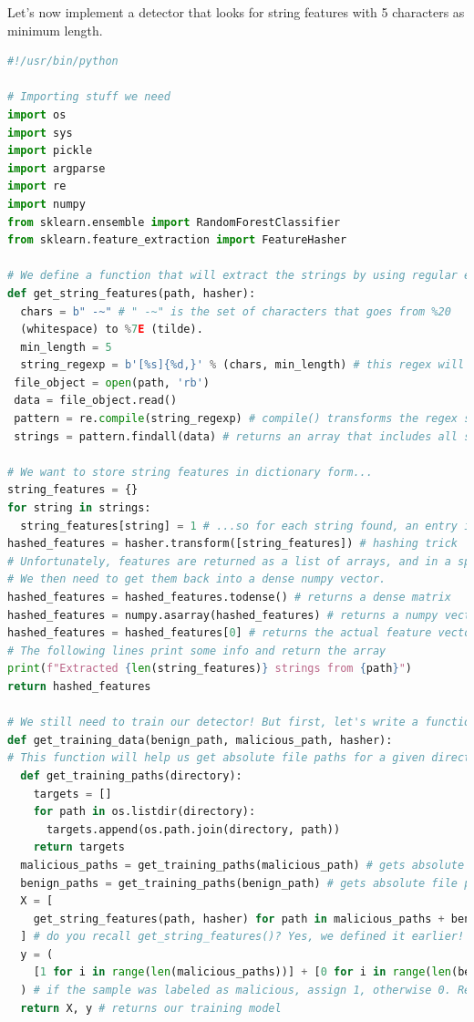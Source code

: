 \documentclass[]{project_plan}
\begin{document}
Let’s now implement a detector that looks for string features with 5 characters as minimum length.

\begin{lstlisting}[language=python]
#!/usr/bin/python

# Importing stuff we need
import os
import sys
import pickle
import argparse
import re
import numpy
from sklearn.ensemble import RandomForestClassifier
from sklearn.feature_extraction import FeatureHasher

# We define a function that will extract the strings by using regular expressions
def get_string_features(path, hasher):
  chars = b" -~" # " -~" is the set of characters that goes from %20
  (whitespace) to %7E (tilde).
  min_length = 5
  string_regexp = b'[%s]{%d,}' % (chars, min_length) # this regex will match every sequence of characters included in the set above, that is at least 5 chars long
 file_object = open(path, 'rb')
 data = file_object.read()
 pattern = re.compile(string_regexp) # compile() transforms the regex string in objects that can be used for pattern matching
 strings = pattern.findall(data) # returns an array that includes all strings that match our regex

# We want to store string features in dictionary form...
string_features = {}
for string in strings:
  string_features[string] = 1 # ...so for each string found, an entry in string_features is created. For example, if we had a "foobar" string, we would have that string_features[foobar]=1.
hashed_features = hasher.transform([string_features]) # hashing trick
# Unfortunately, features are returned as a list of arrays, and in a sparse format nonetheless.
# We then need to get them back into a dense numpy vector.
hashed_features = hashed_features.todense() # returns a dense matrix
hashed_features = numpy.asarray(hashed_features) # returns a numpy vector
hashed_features = hashed_features[0] # returns the actual feature vector
# The following lines print some info and return the array
print(f"Extracted {len(string_features)} strings from {path}")
return hashed_features

# We still need to train our detector! But first, let's write a function to build our training model.
def get_training_data(benign_path, malicious_path, hasher):
# This function will help us get absolute file paths for a given directory
  def get_training_paths(directory):
    targets = []
    for path in os.listdir(directory):
      targets.append(os.path.join(directory, path))
    return targets
  malicious_paths = get_training_paths(malicious_path) # gets absolute file paths for malicious training samples
  benign_paths = get_training_paths(benign_path) # gets absolute file paths for benign training samples
  X = [
    get_string_features(path, hasher) for path in malicious_paths + benign_paths
  ] # do you recall get_string_features()? Yes, we defined it earlier! For each malicious samples, it gets all string features that match our criteria
  y = (
    [1 for i in range(len(malicious_paths))] + [0 for i in range(len(benign_paths))]
  ) # if the sample was labeled as malicious, assign 1, otherwise 0. Remember that we already know if these samples are malicious or not. This is, in other words, our ground truth.
  return X, y # returns our training model


\end{lstlisting}
\end{document}
